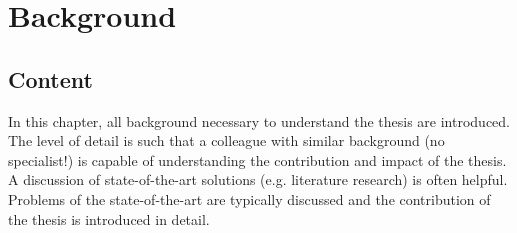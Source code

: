 \chapter{Background}

\section{Content}
In this chapter, all background necessary to understand the thesis are introduced. The level of detail is such that a colleague with similar background (no specialist!) is capable of understanding the contribution and impact of the thesis. A discussion of state-of-the-art solutions (e.g. literature research) is often helpful. Problems of the state-of-the-art are typically discussed and the contribution of the thesis is introduced in detail. 
